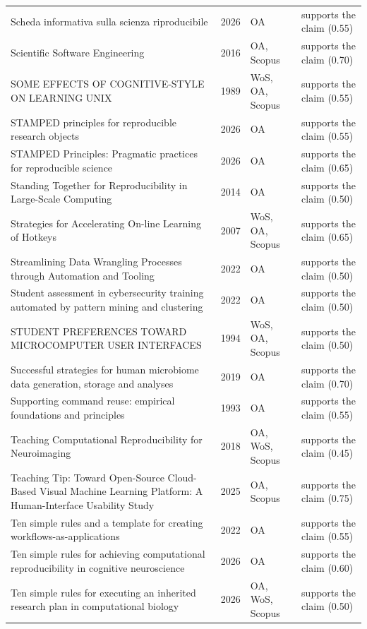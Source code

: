 \begin{longtable}{@{}%
  >{\raggedright\arraybackslash}p{}c%
  >{\raggedright\arraybackslash}p{}%
  >{\raggedright\arraybackslash}p{}@{}}
Scheda informativa sulla scienza riproducibile & 2026 & OA & supports the claim (0.55) \\
Scientific Software Engineering & 2016 & OA, Scopus & supports the claim (0.70) \\
SOME EFFECTS OF COGNITIVE-STYLE ON LEARNING UNIX & 1989 & WoS, OA, Scopus & supports the claim (0.55) \\
STAMPED principles for reproducible research objects & 2026 & OA & supports the claim (0.55) \\
STAMPED Principles: Pragmatic practices for reproducible science & 2026 & OA & supports the claim (0.65) \\
Standing Together for Reproducibility in Large-Scale Computing & 2014 & OA & supports the claim (0.50) \\
Strategies for Accelerating On-line Learning of Hotkeys & 2007 & WoS, OA, Scopus & supports the claim (0.65) \\
Streamlining Data Wrangling Processes through Automation and Tooling & 2022 & OA & supports the claim (0.50) \\
Student assessment in cybersecurity training automated by pattern mining and clustering & 2022 & OA & supports the claim (0.50) \\
STUDENT PREFERENCES TOWARD MICROCOMPUTER USER INTERFACES & 1994 & WoS, OA, Scopus & supports the claim (0.50) \\
Successful strategies for human microbiome data generation, storage and analyses & 2019 & OA & supports the claim (0.70) \\
Supporting command reuse: empirical foundations and principles & 1993 & OA & supports the claim (0.55) \\
Teaching Computational Reproducibility for Neuroimaging & 2018 & OA, WoS, Scopus & supports the claim (0.45) \\
Teaching Tip: Toward Open-Source Cloud-Based Visual Machine Learning Platform: A Human-Interface Usability Study & 2025 & OA, Scopus & supports the claim (0.75) \\
Ten simple rules and a template for creating workflows-as-applications & 2022 & OA & supports the claim (0.55) \\
Ten simple rules for achieving computational reproducibility in cognitive neuroscience & 2026 & OA & supports the claim (0.60) \\
Ten simple rules for executing an inherited research plan in computational biology & 2026 & OA, WoS, Scopus & supports the claim (0.50) \\

\end{longtable}
